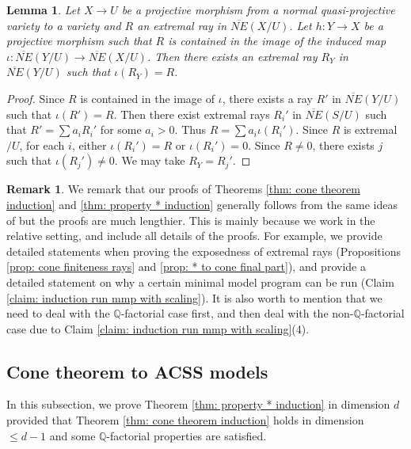 \documentclass[11pt]{amsart}
\numberwithin{equation}{section}
\newcommand{\Qq}{\mathbb{Q}}
\newtheorem{lem}[thm]{Lemma}
\theoremstyle{definition}
\theoremstyle{definition}
\newtheorem{rem}[thm]{Remark}
\theoremstyle{definition}
\begin{document}
\begin{lem}\label{lem: extremal ray under morphism}
    Let $X\rightarrow U$ be a projective morphism from a normal quasi-projective variety to a variety and $R$ an extremal ray in $\overline{NE}(X/U)$. Let $h: Y\rightarrow X$ be a projective morphism such that $R$ is contained in the image of the induced map $\iota: \overline{NE}(Y/U)\rightarrow\overline{NE}(X/U)$. Then there exists an extremal ray $R_Y$ in $\overline{NE}(Y/U)$ such that $\iota(R_Y)=R$.
\end{lem}
\begin{proof}
Since $R$ is contained in the image of $\iota$, there exists a ray $R'$ in $\overline{NE}(Y/U)$ such that $\iota(R')=R$. Then there exist extremal rays $R_i'$ in $\overline{NE}(S/U)$ such that $R'=\sum a_iR_i'$ for some $a_i>0$. Thus $R=\sum a_i\iota(R_i')$. Since $R$ is extremal$/U$, for each $i$, either $\iota(R_i')=R$ or $\iota(R_i')=0$. Since $R\not=0$, there exists $j$ such that $\iota(R_j')\not=0$. We may take $R_Y=R_j'$.
\end{proof}

\begin{rem}
    We remark that our proofs of Theorems \ref{thm: cone theorem induction} and \ref{thm: property * induction} generally follows from the same ideas of \cite[Theorems 3.9, 3.10]{ACSS21} but the proofs are much lengthier. This is mainly because we work in the relative setting, and include all details of the proofs. For example, we provide detailed statements when proving the exposedness of extremal rays (Propositions \ref{prop: cone finiteness rays} and \ref{prop: * to cone final part}), and provide a detailed statement on why a certain minimal model program can be run (Claim \ref{claim: induction run mmp with scaling}). It is also worth to mention that we need to deal with the $\Qq$-factorial case first, and then deal with the non-$\Qq$-factorial case due to Claim \ref{claim: induction run mmp with scaling}(4).
\end{rem}

\subsection{Cone theorem to ACSS models}

In this subsection, we prove Theorem \ref{thm: property * induction} in dimension $d$ provided that Theorem \ref{thm: cone theorem induction} holds in dimension $\leq d-1$ and some $\Qq$-factorial properties are satisfied.
\end{document}
